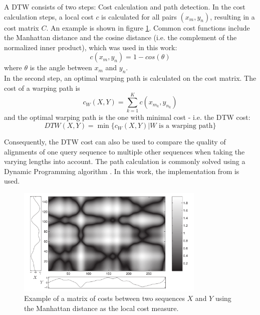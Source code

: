 A DTW consists of two steps: Cost calculation and path detection. In the cost calculation steps, a local cost $c$ is calculated for all pairs $(x_m, y_n)$, resulting in a cost matrix $C$. An example is shown in figure \ref{fig:dtw_cost}. Common cost functions include the Manhattan distance and the cosine distance (i.e. the complement of the normalized inner product), which was used in this work:
\begin{equation}
c(x_m,y_n) =  1 - cos(\theta)
\end{equation}
where $\theta$ is the angle between $x_m$ and $y_n$.\\

In the second step, an optimal warping path is calculated on the cost matrix. The cost of a warping path is
\begin{equation}
c_W(X,Y) =  \sum_{k=1}^{K} c(x_{m_k}, y_{n_k})
\end{equation}
and the optimal warping path is the one with minimal cost - i.e. the DTW cost:
\begin{equation}
DTW(X,Y) =  \min\{c_W(X,Y)|W \text{ is a warping path}\}
\end{equation}

Consequently, the DTW cost can also be used to compare the quality of alignments of one query sequence to multiple other sequences when taking the varying lengths into account.
The path calculation is commonly solved using a Dynamic Programming algorithm \cite{meinard_retrieval}. In this work, the implementation from \cite{ellis_dtw} is used.
\begin{figure}
	\begin{center}
		\includegraphics[width=0.8\textwidth]{images/dtw_cost.png}
		\caption{Example of a matrix of costs between two sequences $X$ and $Y$ using the Manhattan distance as the local cost measure. \cite{meinard_retrieval}}
			\label{fig:dtw_cost}
		\end{center}
	\end{figure}


